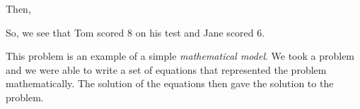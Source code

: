         
        \label{m39262*id161806}Then,\par 
        \label{m39262*id161812}\nopagebreak\noindent{}
    
        
        \label{m39262*id161871}So, we see that Tom scored 8 on his test and Jane scored 6.\par 
        \label{m39262*id161878}This problem is an example of a simple \textsl{mathematical model}. We took a problem and we were able to write a set of equations that represented the problem mathematically. The solution of the equations then gave the solution to the problem.\par 
      
      \label{m39262*uid103}
            \nopagebreak
            
